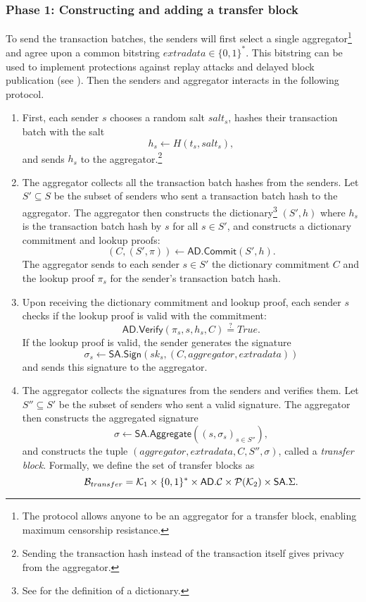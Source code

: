 \subsubsection{Phase 1: Constructing and adding a transfer block}\label{section:transferring-phase-1}

To send the transaction batches, the senders will first select a single aggregator\footnote{The protocol allows anyone to be an aggregator for a transfer block, enabling maximum censorship resistance.} and agree upon a common bitstring \(extradata \in \{0,1\}^*\). This bitstring can be used to implement protections against replay attacks and delayed block publication (see ). Then the senders and aggregator interacts in the following protocol.

\begin{enumerate}
	\item First, each sender \(s\) chooses a random salt \(salt_s\), hashes their transaction batch with the salt \[h_s \leftarrow H(t_s,salt_s),\] and sends \(h_s\) to the aggregator.\footnote{Sending the transaction hash instead of the transaction itself gives privacy from the aggregator.}
	\item The aggregator collects all the transaction batch hashes from the senders. Let \(S' \subseteq S\) be the subset of senders who sent a transaction batch hash to the aggregator. The aggregator then constructs the dictionary\footnote{See  for the definition of a dictionary.} \((S',h)\) where \(h_s\) is the transaction batch hash by \(s\) for all \(s \in S'\), and constructs a dictionary commitment and lookup proofs: \[(C, (S',\pi)) \leftarrow \mathsf{AD.Commit}(S',h).\] The aggregator sends to each sender \(s \in S'\) the dictionary commitment \(C\) and the lookup proof \(\pi_s\) for the sender's transaction batch hash.
	\item Upon receiving the dictionary commitment and lookup proof, each sender \(s\) checks if the lookup proof is valid with the commitment: \[\mathsf{AD.Verify}(\pi_s,s,h_s,C) \stackrel{?}{=} True.\] If the lookup proof is valid, the sender generates the signature \[\sigma_s \leftarrow \mathsf{SA.Sign}(sk_s,(C,aggregator,extradata))\] and sends this signature to the aggregator.
	\item The aggregator collects the signatures from the senders and verifies them. Let \(S'' \subseteq S'\) be the subset of senders who sent a valid signature. The aggregator then constructs the aggregated signature \[\sigma \leftarrow \mathsf{SA.Aggregate}((s,\sigma_s)_{s \in S''}),\] and constructs the tuple \((aggregator,extradata,C,S'',\sigma)\), called a \emph{transfer block}. Formally, we define the set of transfer blocks \href{https://github.com/\repo FVIntmax/Block.lean#L25}{\ExternalLink}as \[\mathcal{B}_{transfer} = \mathcal{K}_1 \times \{0,1\}^* \times \mathsf{AD}.\mathcal{C} \times \mathcal{P}(\mathcal{K}_2) \times \mathsf{SA}.\Sigma.\]

\end{enumerate}
